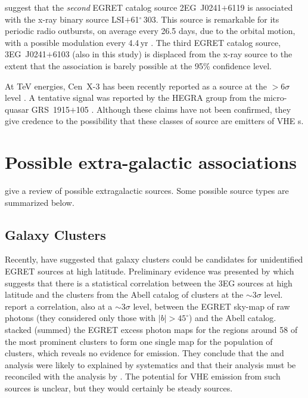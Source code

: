 \citet{REF::KNIFFEN::APJ1997} suggest that the \textit{second} EGRET
catalog source 2EG~J0241$+$6119 is associated with the x-ray binary
source LSI$+$61$^\circ$\,303. This source is remarkable for its
periodic radio outbursts, on average every 26.5 days, due to the
orbital motion, with a possible modulation every 4.4\,yr
\citep{REF::GREGORY::APJ2002}. The third EGRET catalog source, 
3EG~J0241$+$6103 (also in this study) is displaced from the x-ray source
to the extent that the association is barely possible at the 95\%
confidence level.

At TeV energies, Cen~X-3 has been recently reported as a \Gray source
at the $>6\sigma$ level \citep{REF::CHADWICK::APJ1998}. A tentative
signal was reported by the HEGRA group from the micro-quasar
GRS~1915$+$105 \citep{REF::AHARONIAN::ECRS1997}. Although these claims
have not been confirmed, they give credence to the possibility that
these classes of source are emitters of VHE {\Grayc}s.

\section{Possible extra-galactic associations}
\label{SEC::SOURCES::EXTRAGALACTIC}

\citet{REF::TORRES::BOOK2003} give a review of possible extragalactic 
\Gray sources. Some possible source types are summarized below.

\subsection{Galaxy Clusters}
\label{SEC::SOURCES::CLUSTERS}

Recently, \citet{REF::KAWASAKI::APJ2002} have suggested that galaxy
clusters could be candidates for unidentified EGRET sources at high
latitude. Preliminary evidence was presented by
\citet{REF::COLAFRANCESCO::GAMMA2001} which suggests that there is a
statistical correlation between the 3EG sources at high latitude and
the clusters from the Abell catalog of clusters
\citep{REF::ABELL::APJS1989} at the $\sim3\sigma$ level. 
\citet{REF::SCHARF::APJ2002} report a correlation, also at a 
$\sim3\sigma$ level, between the EGRET sky-map of raw photons (they
considered only those with $|b|>45^\circ$) and the Abell
catalog. \citet{REF::REIMER::APJ2003} stacked (summed) the EGRET
excess photon maps for the regions around 58 of the most prominent
clusters to form one single map for the population of clusters, which
reveals no evidence for emission. They conclude that the
\citet{REF::COLAFRANCESCO::GAMMA2001} and  \citet{REF::KAWASAKI::APJ2002}
analysis were likely to explained by systematics and that their
analysis must be reconciled with the analysis by 
\citet{REF::SCHARF::APJ2002}. The potential for VHE emission from such
sources is unclear, but they would certainly be steady sources.

